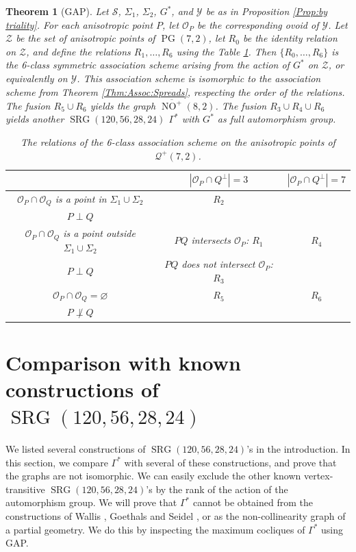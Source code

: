 \documentclass[a4paper]{article}
\newtheorem{thm}{Theorem}[section]
\theoremstyle{definition}
\newcommand{\mo}{\mathcal O}
\newcommand{\mq}{\mathcal Q}
\newcommand{\ms}{\mathcal S}
\newcommand{\my}{\mathcal Y}
\newcommand{\mz}{\mathcal Z}
\DeclareMathOperator{\PG}{PG}
\newcommand{\pg}{\PG}
\DeclareMathOperator{\NO}{NO}
\newcommand{\nono}{\overline{\NO^+}(8,2)}
\DeclareMathOperator{\SRG}{SRG}
\begin{document}
\begin{thm}[GAP]
 \label{Thm:Assoc:Ovoids}
 Let $\ms$, $\Sigma_1$, $\Sigma_2$, $G^*$, and $\my$ be as in Proposition \ref{Prop:by triality}.
 For each anisotropic point $P$, let $\mo_P$ be the corresponding ovoid of $\my$.
 Let $\mz$ be the set of anisotropic points of $\pg(7,2)$, let $R_0$ be the identity relation on $\mz$, and define the relations $R_1, \dots, R_6$ using the Table \ref{tab:Assoc2}.
 Then $\{R_0, \dots, R_6\}$ is the 6-class symmetric association scheme arising from the action of $G^*$ on $\mz$, or equivalently on $\my$.
 This association scheme is isomorphic to the association scheme from Theorem \ref{Thm:Assoc:Spreads}, respecting the order of the relations.
 The fusion $R_5 \cup R_6$ yields the graph $\nono$.
 The fusion $R_3 \cup R_4 \cup R_6$ yields another $\SRG(120,56,28,24)$ $\Gamma^*$ with $G^*$ as full automorphism group.

 \begin{table}[h!]
 \centering
 \begin{tabular}{|c||c|c|} \hline
   & $|\mo_P \cap Q^\perp| = 3$ & $|\mo_P \cap Q^\perp| = 7$ \\ \hline \hline
   $\mo_P \cap \mo_Q$ is a point in $\Sigma_1 \cup \Sigma_2$ & $R_2$ & \\
   $P \perp Q$ & & \\ \hline
   $\mo_P \cap \mo_Q$ is a point outside $\Sigma_1 \cup \Sigma_2$ & $PQ$ intersects $\mo_P $: $R_1$ & $R_4$ \\
   $P \perp Q$ & $PQ$ does not intersect $\mo_P$: $R_3$ & \\ \hline
   $\mo_P \cap \mo_Q = \varnothing$ & $R_5$ & $R_6$\\
   $P \not \perp Q$ & & \\ \hline
 \end{tabular}
 \caption{The relations of the 6-class association scheme on the anisotropic points of $\mq^+(7,2)$.}
 \label{tab:Assoc2}
\end{table}

\end{thm}

\section{Comparison with known constructions of \texorpdfstring{$\SRG(120,56,28,24)$}{}}

We listed several constructions of $\SRG(120,56,28,24)$'s in the introduction.
In this section, we compare $\Gamma^*$ with several of these constructions, and prove that the graphs are not isomorphic.
We can easily exclude the other known vertex-transitive $\SRG(120,56,28,24)$'s by the rank of the action of the automorphism group.
We will prove that $\Gamma^*$ cannot be obtained from the constructions of Wallis \cite{Wallis}, Goethals and Seidel \cite{Goethals:Seidel}, or as the non-collinearity graph of a partial geometry.
We do this by inspecting the maximum cocliques of $\Gamma^*$ using GAP.
\end{document}
